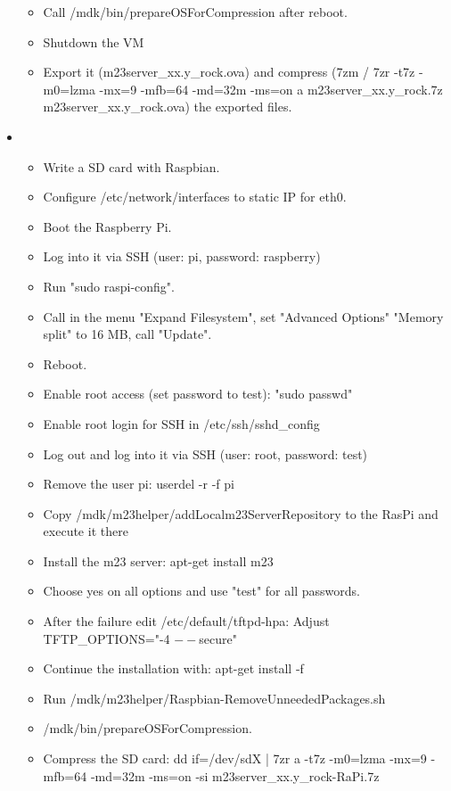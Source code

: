 \begin{itemize}
\begin{itemize}
		\item Call /mdk/bin/prepareOSForCompression after reboot.
		\item Shutdown the VM
		\item Export it (m23server\_xx.y\_rock.ova) and compress (7zm / 7zr -t7z -m0=lzma -mx=9 -mfb=64 -md=32m -ms=on a m23server\_xx.y\_rock.7z m23server\_xx.y\_rock.ova) the exported files.
	\end{itemize}
\item
	\begin{itemize}
		\item Write a SD card with Raspbian.
		\item Configure /etc/network/interfaces to static IP for eth0.
		\item Boot the Raspberry Pi.
		\item Log into it via SSH (user: pi, password: raspberry)
		\item Run "sudo raspi-config".
		\item Call in the menu "Expand Filesystem", set "Advanced Options" "Memory split" to 16 MB, call "Update".
		\item Reboot.
		\item Enable root access (set password to test): "sudo passwd"
		\item Enable root login for SSH in /etc/ssh/sshd\_config
		\item Log out and log into it via SSH (user: root, password: test)
		\item Remove the user pi: userdel -r -f pi
		\item Copy /mdk/m23helper/addLocalm23ServerRepository to the RasPi and execute it there
		\item Install the m23 server: apt-get install m23
		\item Choose yes on all options and use "test" for all passwords.
		\item After the failure edit /etc/default/tftpd-hpa: Adjust TFTP\_OPTIONS="-4 $--$secure"
		\item Continue the installation with: apt-get install -f
		\item Run /mdk/m23helper/Raspbian-RemoveUnneededPackages.sh
		\item /mdk/bin/prepareOSForCompression.
		\item Compress the SD card: dd if=/dev/sdX | 7zr a -t7z -m0=lzma -mx=9 -mfb=64 -md=32m -ms=on -si m23server\_xx.y\_rock-RaPi.7z
	\end{itemize}
\end{itemize}


